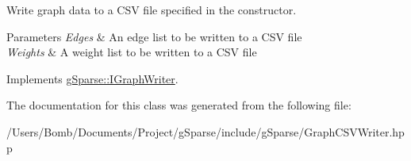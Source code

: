 Write graph data to a C\+SV file specified in the constructor. 


\begin{DoxyParams}{Parameters}
{\em Edges} & An edge list to be written to a C\+SV file \\
\hline
{\em Weights} & A weight list to be written to a C\+SV file \\
\hline
\end{DoxyParams}


Implements \mbox{\hyperlink{classg_sparse_1_1_i_graph_writer_ae2c720f3e37629da40fdc5d0e4fe2dd2}{g\+Sparse\+::\+I\+Graph\+Writer}}.



The documentation for this class was generated from the following file\+:\begin{DoxyCompactItemize}
\item 
/\+Users/\+Bomb/\+Documents/\+Project/g\+Sparse/include/g\+Sparse/Graph\+C\+S\+V\+Writer.\+hpp\end{DoxyCompactItemize}
